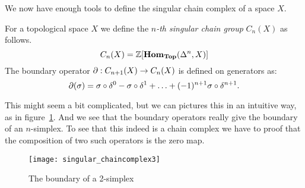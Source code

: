 
We now have enough tools to define the singular chain complex of a space $X$.

\begin{definition}
	For a topological space $X$ we define the \emph{$n$-th singular chain group} $C_n(X)$ as follows.
	$$ C_n(X) = \mathbb{Z}[\mathbf{Hom}_{\mathbf{Top}}(\Delta^n, X)] $$
	The boundary operator $\partial : C_{n+1}(X) \to C_n(X)$ is defined on generators as:
	$$ \partial(\sigma) = \sigma \circ \delta^0 - \sigma \circ \delta^1 + \ldots + (-1)^{n+1} \sigma \circ \delta^{n+1}.$$
\end{definition}

This might seem a bit complicated, but we can pictures this in an intuitive way, as in figure~\ref{fig:singular_chaincomplex3}. And we see that the boundary operators really give the boundary of an $n$-simplex. To see that this indeed is a chain complex we have to proof that the composition of two such operators is the zero map.
\begin{figure}
	\texttt{[image: singular\_chaincomplex3]}
	\caption{The boundary of a 2-simplex}
	\label{fig:singular_chaincomplex3}
\end{figure}

